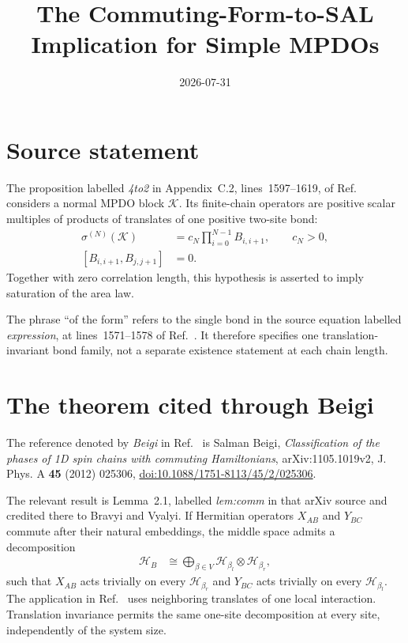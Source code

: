 \documentclass{article}
\title{The Commuting-Form-to-SAL Implication for Simple MPDOs}
\author{}
\date{2026-07-31}
\begin{document}
\maketitle
{}

\section{Source statement}

The proposition labelled \emph{4to2} in Appendix~C.2, lines~1597--1619, of
Ref.~\cite{Cirac2016MPDO_arXiv} considers a normal MPDO block
$\mathcal K$. Its finite-chain operators are positive scalar multiples of
products of translates of one positive two-site bond:
\begin{align}
    \sigma^{(N)}(\mathcal K)
        &= c_N\prod_{i=0}^{N-1}B_{i,i+1},
    \qquad c_N>0,
    \label{eq:cpsv16_commuting_form_to_sal_source_bond_product}\\
    [B_{i,i+1},B_{j,j+1}]
        &=0.
    \label{eq:cpsv16_commuting_form_to_sal_source_bond_commutation}
\end{align}
Together with zero correlation length, this hypothesis is asserted to imply
saturation of the area law.

The phrase ``of the form'' refers to the single bond in the source equation
labelled \emph{expression}, at lines~1571--1578 of
Ref.~\cite{Cirac2016MPDO_arXiv}. It therefore specifies one
translation-invariant bond family, not a separate existence statement at each
chain length.

\section{The theorem cited through Beigi}

The reference denoted by \emph{Beigi} in
Ref.~\cite{Cirac2016MPDO_arXiv} is Salman Beigi,
\emph{Classification of the phases of 1D spin chains with commuting
Hamiltonians}, arXiv:1105.1019v2, J. Phys. A \textbf{45} (2012) 025306,
\href{https://doi.org/10.1088/1751-8113/45/2/025306}{%
doi:10.1088/1751-8113/45/2/025306}.

The relevant result is Lemma~2.1, labelled \emph{lem:comm} in that arXiv
source and credited there to Bravyi and Vyalyi. If Hermitian operators
$X_{AB}$ and $Y_{BC}$ commute after their natural embeddings, the middle
space admits a decomposition
\begin{align}
    \mathcal H_B
        &\cong
        \bigoplus_{\beta\in V}
        \mathcal H_{\beta_l}\otimes\mathcal H_{\beta_r},
    \label{eq:cpsv16_commuting_form_to_sal_middle_space_decomposition}
\end{align}
such that $X_{AB}$ acts trivially on every $\mathcal H_{\beta_r}$ and
$Y_{BC}$ acts trivially on every $\mathcal H_{\beta_l}$. The application in
Ref.~\cite{Cirac2016MPDO_arXiv} uses neighboring translates of one local
interaction. Translation invariance permits the same one-site decomposition
at every site, independently of the system size.
\end{document}
